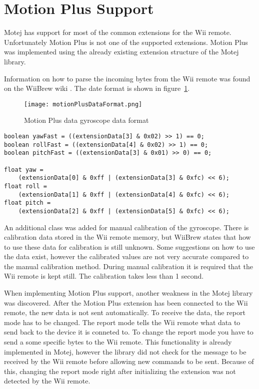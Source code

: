 \section{Motion Plus Support}
Motej has support for most of the common extensions for the Wii remote. Unfortunately Motion Plus is not one of the supported extensions. Motion Plus was implemented using the already existing extension structure of the Motej library.

Information on how to parse the incoming bytes from the Wii remote was found on the WiiBrew wiki \cite{wiiBrew}. The date format is shown in figure~\ref{fig:motionPlusDataFormat}.

\begin{figure}[h!]
  \centering
    \texttt{[image: motionPlusDataFormat.png]}
    \caption{\footnotesize Motion Plus data gyroscope data format}
    \label{fig:motionPlusDataFormat}
\end{figure}

\begin{lstlisting}
boolean yawFast = ((extensionData[3] & 0x02) >> 1) == 0;
boolean rollFast = ((extensionData[4] & 0x02) >> 1) == 0;
boolean pitchFast = ((extensionData[3] & 0x01) >> 0) == 0;

float yaw = 
	(extensionData[0] & 0xff | (extensionData[3] & 0xfc) << 6);
float roll = 
	(extensionData[1] & 0xff | (extensionData[4] & 0xfc) << 6);
float pitch = 
	(extensionData[2] & 0xff | (extensionData[5] & 0xfc) << 6);
\end{lstlisting}

An additional class was added for manual calibration of the gyroscope. There is calibration data stored in the Wii remote memory, but WiiBrew states that how to use these data for calibration is still unknown. Some suggestions on how to use the data exist, however the calibrated values are not very accurate compared to the manual calibration method. During manual calibration it is required that the Wii remote is kept still. The calibration takes less than 1 second.


When implementing Motion Plus support, another weakness in the Motej library was discovered. After the Motion Plus extension has been connected to the Wii remote, the new data is not sent automatically. To receive the data, the report mode has to be changed. The report mode tells the Wii remote what data to send back to the device it is conneted to. To change the report mode you have to send a some specific bytes to the Wii remote. This functionality is already implemented in Motej, however the library did not check for the message to be received by the Wii remote before allowing new commands to be sent. Because of this, changing the report mode right after initializing the extension was not detected by the Wii remote. 